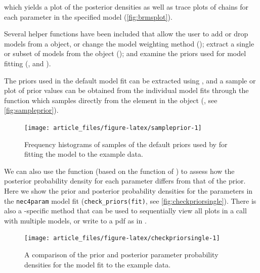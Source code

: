 \documentclass[
  shortnames]{jss}
\begin{document}
which yields a plot of the posterior densities as well as trace plots of chains for each parameter in the specified model (\autoref{fig:brmsplot}).

Several helper functions have been included that allow the user to add or drop models from a  object, or change the model weighting method (); extract a single or subset of models from the  object (); and examine the priors used for model fitting (,  and ).

The priors used in the default model fit can be extracted using , and a sample or plot of prior values can be obtained from the individual  model fits through the function  which samples directly from the  element in the  object (, see \autoref{fig:sampleprior}).

\begin{CodeChunk}
\begin{figure}[!ht]

{\centering \texttt{[image: article\_files/figure-latex/sampleprior-1]} 

}

\caption[Frequency histograms of samples of the default priors used by  for fitting the  model to the example data]{Frequency histograms of samples of the default priors used by  for fitting the  model to the example data.}\label{fig:sampleprior}
\end{figure}
\end{CodeChunk}

We can also use the function  (based on the  function of ) to assess how the posterior probability density for each parameter differs from that of the prior. Here we show the prior and posterior probability densities for the parameters in the \texttt{nec4param} model fit (\texttt{check\_priors(fit)}, see \autoref{fig:checkpriorsingle}). There is also a -specific method that can be used to sequentially view all plots in a  call with multiple models, or write to a pdf as in .

\begin{CodeChunk}
\begin{figure}[!ht]

{\centering \texttt{[image: article\_files/figure-latex/checkpriorsingle-1]} 

}

\caption[A comparison of the prior and posterior parameter probability densities for the  model fit to the example data]{A comparison of the prior and posterior parameter probability densities for the  model fit to the example data.}\label{fig:checkpriorsingle}
\end{figure}
\end{CodeChunk}
\end{document}
